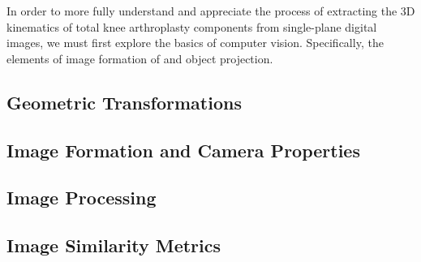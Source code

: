 In order to more fully understand and appreciate the process of extracting the 3D kinematics of total knee arthroplasty components from single-plane digital images, we must first explore the basics of computer vision. Specifically, the elements of image formation of and object projection.

\subsection{Geometric Transformations}
\label{sec:geometric-transformations}


\subsection{Image Formation and Camera Properties}
\label{sec:img-form-camera-props}


\subsection{Image Processing}
\label{sec:image-processing}


\subsection{Image Similarity Metrics}
\label{sec:image-similarity}

